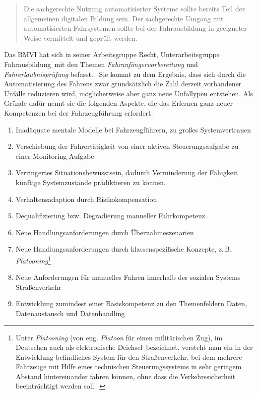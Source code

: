 \documentclass[twoside,a4paper,12pt]{article}
\begin{document}
\begin{quote}
\glqq
Die sachgerechte Nutzung automatisierter Systeme sollte bereits Teil der allgemeinen digitalen Bildung sein. Der sachgerechte 
Umgang mit automatisierten Fahrsystemen sollte
bei der Fahrausbildung in geeigneter Weise vermittelt und geprüft werden.\grqq\mbox{~\cite[S. 13]{ek}}
\end{quote}

Das BMVI hat sich in seiner Arbeitsgruppe \glqq Recht\grqq, Unterarbeitsgruppe \glqq Fahrausbildung\grqq\, mit den Themen
\textit{Fahranfängervorbereitung} und \textit{Fahrerlaubnisprüfung} befasst.\mbox{~\cite[S. 26ff]{bmvi2}} Sie kommt zu dem Ergebnis, dass sich durch die
Automatisierung des Fahrens zwar grundsätzlich die Zahl derzeit vorhandener Unfälle reduzieren wird, möglicherweise aber ganz neue Unfallypen entstehen. Als Gründe dafür nennt sie
die folgenden Aspekte, die das Erlernen ganz neuer Kompetenzen bei der Fahrzeugführung erfordert:
\begin{enumerate}
\item Inadäquate mentale Modelle bei Fahrzeugführern, zu großes Systemvertrauen
\item Verschiebung der Fahrertätigkeit von einer aktiven Steuerungsaufgabe zu einer Monitoring-Aufgabe
\item Verringertes Situationsbewusstsein, dadurch Verminderung der Fähigkeit künftige Systemzustände prädiktieren zu können.
\item Verhaltensadaption durch Risikokompensation
\item Dequalifizierung bzw. Degradierung manueller Fahrkompetenz
\item Neue Handlungsanforderungen durch Übernahmeszenarien
\item Neue Handlungsanforderungen durch klassenspezifische Konzepte, z.\,B. \textit{Platooning}\footnote{Unter \textit{Platooning} (von eng. \textit{Platoon} für einen militärischen Zug), im Deutschen auch als \glqq elektronische Deichsel\grqq\ bezeichnet, versteht man ein in der Entwicklung befindliches System für den Straßenverkehr, bei dem mehrere Fahrzeuge mit 
Hilfe eines technischen Steuerungssystems in sehr geringem Abstand hintereinander fahren können, ohne dass die Verkehrssicherheit beeinträchtigt werden soll.~\cite{wi}}
\item Neue Anforderungen für manuelles Fahren innerhalb des sozialen Systems Straßenverkehr
\item Entwicklung zumindest einer Basiskompetenz zu den Themenfeldern Daten, Datenaustausch und Datenhandling
\end{enumerate}
\end{document}
